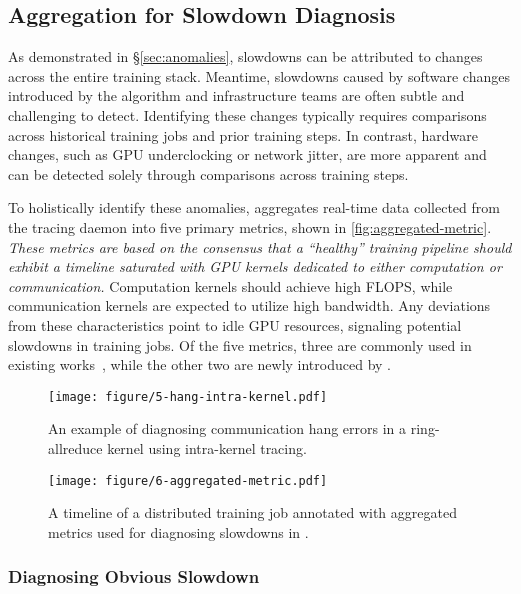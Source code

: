 \subsection{Aggregation for Slowdown Diagnosis}


\label{sec:slowdown-anomalies}
As demonstrated in \S\ref{sec:anomalies}, slowdowns can be attributed to changes across the entire training stack.
Meantime, slowdowns caused by software changes introduced by the algorithm and infrastructure teams are often subtle and challenging to detect.
Identifying these changes typically requires comparisons across historical training jobs and prior training steps.
In contrast, hardware changes, such as GPU underclocking or network jitter, are more apparent and can be detected solely through comparisons across training steps.

To holistically identify these anomalies, \sysname{} aggregates real-time data collected from the tracing daemon into five primary metrics, shown in \autoref{fig:aggregated-metric}.
\textit{
These metrics are based on the consensus that a “healthy” training pipeline should exhibit a timeline saturated with GPU kernels dedicated to either computation or communication.}
Computation kernels should achieve high FLOPS, while communication kernels are expected to utilize high bandwidth.
Any deviations from these characteristics point to idle GPU resources, signaling potential slowdowns in training jobs.
Of the five metrics, three are commonly used in existing works~\cite{jiangMegaScaleScaling,wuFALCONPinpointing}, while the other two are newly introduced by \sysname{}.

\begin{figure}
    \centering
    \texttt{[image: figure/5-hang-intra-kernel.pdf]}
    \caption{An example of diagnosing communication hang errors in a ring-allreduce kernel using intra-kernel tracing.}
    \label{fig:hang-comm}
    \vspace{-4mm}
\end{figure}
\begin{figure*}
    \centering
    \texttt{[image: figure/6-aggregated-metric.pdf]}
    \vspace{-2mm}
    \caption{A timeline of a distributed training job annotated with aggregated metrics used for diagnosing slowdowns in \sysname{}.}
    \label{fig:aggregated-metric}
    \vspace{-4mm}
\end{figure*}
\subsubsection{Diagnosing Obvious Slowdown}
\label{sec:diagnose_obvious}
